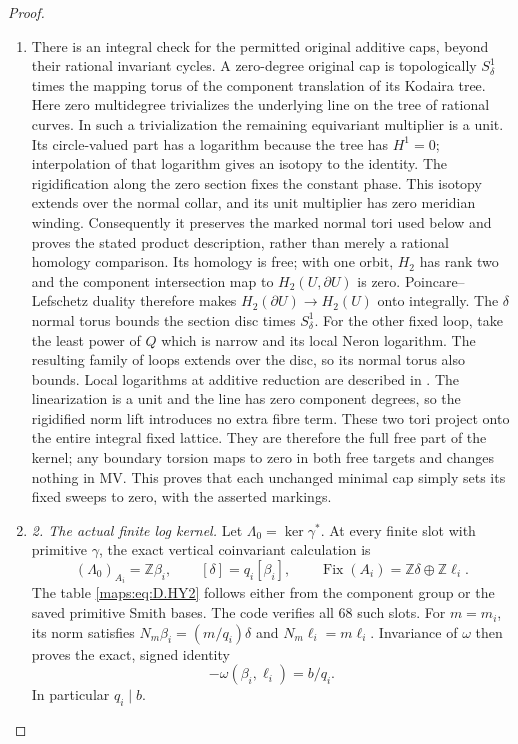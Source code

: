 \begin{proof}
\begin{enumerate}[label=\arabic*.,leftmargin=*]
\item There is an integral check for the permitted original additive
caps, beyond their rational invariant cycles. A zero-degree original
cap is topologically $S^1_\delta$ times the mapping torus of the
component translation of its Kodaira tree. Here zero multidegree
trivializes the underlying line on the tree of rational curves.
In such a trivialization the remaining equivariant multiplier is a
unit. Its circle-valued part has a logarithm because the tree has
$H^1=0$; interpolation of that logarithm gives an isotopy to the
identity. The rigidification along the zero section fixes the
constant phase. This isotopy extends over the normal collar, and
its unit multiplier has zero meridian winding. Consequently it
preserves the marked normal tori used below and proves the stated
product description, rather than merely a rational homology
comparison. Its homology is free;
with one orbit, $H_2$ has rank two and the component intersection
map to $H_2(U,\partial U)$ is zero. Poincare--Lefschetz duality
therefore makes $H_2(\partial U)\to H_2(U)$ onto integrally.
The $\delta$ normal torus bounds the section disc times $S^1_\delta$.
For the other fixed loop, take the least power of $Q$ which is
narrow and its local Neron logarithm. The resulting family of loops
extends over the disc, so its normal torus also bounds. Local
logarithms at additive reduction are described in
\cite[Section 2.4, equation (2.2)]{manUU21}.
The linearization is a unit and the line has zero component degrees,
so the rigidified norm lift introduces no extra fibre term.
These two tori project onto the entire integral fixed lattice.
They are therefore the full free part of the kernel; any boundary
torsion maps to zero in both free targets and changes nothing in
MV. This proves that each unchanged minimal cap simply sets its
fixed sweeps to zero, with the asserted markings.

\item \emph{2. The actual finite log kernel.}
Let $\Lambda_0=\ker\gamma^*$. At every finite slot with primitive
$\gamma$, the exact vertical coinvariant calculation is
\[
 (\Lambda_0)_{A_i}=\mathbb Z\beta_i,
 \qquad [\delta]=q_i[\beta_i],
 \qquad \operatorname{Fix}(A_i)=\mathbb Z\delta\oplus\mathbb Z\ell_i.
                                                               \tag{D.HY6}\label{maps:eq:D.HY6}
\]
The table \eqref{maps:eq:D.HY2} follows either from the component group or the
saved primitive Smith bases. The code verifies all $68$ such slots.
For $m=m_i$, its norm satisfies
$N_m\beta_i=(m/q_i)\delta$ and $N_m\ell_i=m\ell_i$.
Invariance of $\omega$ then proves the exact, signed identity
\[
                     -\omega(\beta_i,\ell_i)=b/q_i.
\]
In particular $q_i\mid b$.


\end{enumerate}
\end{proof}
